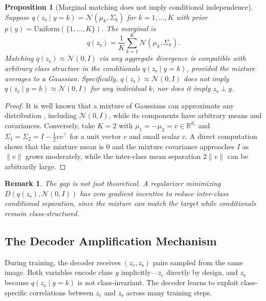 \documentclass[10pt]{article}
\newcommand{\zc}{z_{\mathrm{c}}}
\newcommand{\zs}{z_{\mathrm{s}}}
\newcommand{\R}{\mathbb{R}}
\newtheorem{proposition}{Proposition}
\newtheorem{remark}{Remark}
\begin{document}
\begin{proposition}[Marginal matching does not imply conditional independence]
\label{prop:marginal-not-sufficient}
Suppose $q(\zs\mid y{=}k) = \mathcal{N}(\mu_k, \Sigma_k)$ for $k=1,\dots,K$ with
prior $p(y) = \mathrm{Uniform}(\{1,\dots,K\})$.
The marginal is
\begin{equation}
  q(\zs) = \frac{1}{K}\sum_{k=1}^K \mathcal{N}(\mu_k, \Sigma_k).
\end{equation}
Matching $q(\zs)\approx\mathcal{N}(0,I)$ via any aggregate divergence is compatible
with \emph{arbitrary} class structure in the conditionals $q(\zs\mid y{=}k)$,
provided the mixture averages to a Gaussian.
Specifically, $q(\zs)\approx\mathcal{N}(0,I)$ does not imply
$q(\zs\mid y{=}k)\approx\mathcal{N}(0,I)$ for any individual $k$, nor does it imply
$\zs\perp y$.
\end{proposition}

\begin{proof}
It is well known that a mixture of Gaussians can approximate any distribution
\citep{goodfellow2016deep}, including $\mathcal{N}(0,I)$, while its components have
arbitrary means and covariances.
Conversely, take $K=2$ with $\mu_1=-\mu_2=v\in\R^{d_s}$ and
$\Sigma_1=\Sigma_2=I-\frac{1}{2}vv^\top$ for a unit vector $v$ and small scalar $c$.
A direct computation shows that the mixture mean is $0$ and the mixture covariance
approaches $I$ as $\|v\|$ grows moderately, while the inter-class mean separation
$2\|v\|$ can be arbitrarily large.
\end{proof}

\begin{remark}
The gap is not just theoretical.
A regularizer minimizing $D(q(\zs), \mathcal{N}(0,I))$ has zero gradient incentive
to reduce inter-class conditional separation, since the mixture can match the target
while conditionals remain class-structured.
\end{remark}

\subsection{The Decoder Amplification Mechanism}
\label{sec:mechanism}

During training, the decoder receives $(\zc, \zs)$ pairs sampled from the same image.
Both variables encode class $y$ implicitly---$\zc$ directly by design, and $\zs$
because $q(\zs\mid y{=}k)$ is not class-invariant.
The decoder learns to exploit class-specific correlations between $\zc$ and $\zs$
across many training steps.
\end{document}
